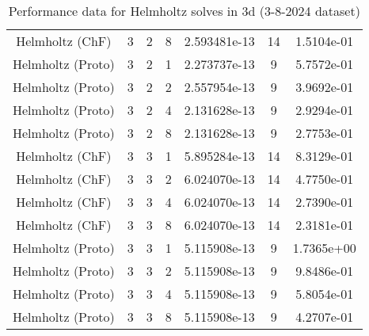 \documentclass{article}
\begin{document}
\begin{small}
\begin{table}
\begin{center}
\begin{tabular}{|c|c|c|c|c|c||c|}
        Helmholtz       (ChF) & 3 & 2 & 8& 2.593481e-13 & 14 & 1.5104e-01\\
        Helmholtz     (Proto) & 3 & 2 & 1& 2.273737e-13 & 9 & 5.7572e-01\\
        Helmholtz     (Proto) & 3 & 2 & 2& 2.557954e-13 & 9 & 3.9692e-01\\
        Helmholtz     (Proto) & 3 & 2 & 4& 2.131628e-13 & 9 & 2.9294e-01\\
        Helmholtz     (Proto) & 3 & 2 & 8& 2.131628e-13 & 9 & 2.7753e-01\\
        \hline 
        Helmholtz       (ChF) & 3 & 3 & 1& 5.895284e-13 & 14 & 8.3129e-01\\
        Helmholtz       (ChF) & 3 & 3 & 2& 6.024070e-13 & 14 & 4.7750e-01\\
        Helmholtz       (ChF) & 3 & 3 & 4& 6.024070e-13 & 14 & 2.7390e-01\\
        Helmholtz       (ChF) & 3 & 3 & 8& 6.024070e-13 & 14 & 2.3181e-01\\
        Helmholtz     (Proto) & 3 & 3 & 1& 5.115908e-13 & 9 & 1.7365e+00\\
        Helmholtz     (Proto) & 3 & 3 & 2& 5.115908e-13 & 9 & 9.8486e-01\\
        Helmholtz     (Proto) & 3 & 3 & 4& 5.115908e-13 & 9 & 5.8054e-01\\
        Helmholtz     (Proto) & 3 & 3 & 8& 5.115908e-13 & 9 & 4.2707e-01\\
        \hline 
      \end{tabular} 
    \end{center}   
    \label{tab::datareductiontable3102024.helm_3} 
    \caption{Performance data for  Helmholtz solves in 3d (3-8-2024 dataset)}
  \end{table} 
\end{small}
\end{document}
